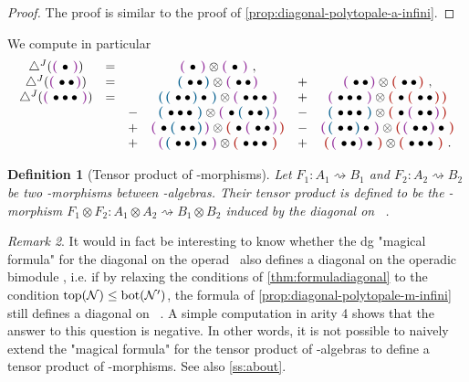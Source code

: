 \documentclass[twoside, 12pt]{amsart}
\newtheorem{definition}{Definition}[section]
\theoremstyle{remark}
\newtheorem{remark}[definition]{\sc Remark}
\begin{document}
\begin{proof}
The proof is similar to the proof of \cref{prop:diagonal-polytopale-a-infini}. 
\end{proof}

We compute in particular 
\[
\begin{matrix}
\diagminf ( \purple{ \bullet } )  
&=&  & \purple{ \bullet } \otimes \purple{ \bullet } \ , & &  \\
\diagminf ( \purple{ \bullet \bullet } ) 
&=& & \blue{\bullet \bullet} \otimes \purple{\bullet \bullet} & + & \purple{\bullet \bullet} \otimes \red{\bullet \bullet} \ , \\
\diagminf (\purple{\bullet \bullet \bullet}) 
&=& 
& \blue{\blue{\bullet \bullet}\bullet} \otimes \purple{\bullet \bullet \bullet} 
& + & \purple{\bullet \bullet \bullet} \otimes \red{\bullet \red{\bullet \bullet}} \\
& &- &  \blue{\bullet \bullet \bullet} \otimes \purple{\bullet \blue{\bullet \bullet}}    &  - & \blue{\bullet \bullet \bullet} \otimes \red{\bullet \purple{\bullet \bullet}}  \\  &   &+ & \purple{\bullet \blue{\bullet \bullet}} \otimes \red{\bullet \purple{\bullet \bullet}} 
  &  - & \purple{\blue{\bullet \bullet} \bullet} \otimes \red{\purple{\bullet \bullet} \bullet} \\ & &  + & \purple{\blue{\bullet \bullet} \bullet} \otimes \red{\bullet \bullet \bullet}   &  + & \red{\purple{\bullet \bullet} \bullet} \otimes \red{\bullet \bullet \bullet} \ .
  \end{matrix}
\]

\begin{definition}[Tensor product of \Ainf -morphisms] \label{def:tensor-ainf-morph}
Let $F_1 : A_1 \rightsquigarrow B_1$ and $F_2 : A_2 \rightsquigarrow B_2$ be two \Ainf -morphisms between \Ainf-algebras.
Their tensor product is defined to be the \Ainf -morphism $F_1 \otimes F_2 : A_1 \otimes A_2 \rightsquigarrow B_1 \otimes B_2$ induced by the diagonal \diagminf on \Minf \ .
\end{definition}

\begin{remark} \label{rmk:non-a-topbot}
It would in fact be interesting to know whether the dg "magical formula" for the diagonal on the operad \Ainf\
also defines a diagonal on the operadic bimodule \Minf, i.e. if by relaxing the conditions of \cref{thm:formuladiagonal} to the condition $\operatorname{top}(\mathcal{N}) \leq \operatorname{bot}(\mathcal{N'})$, the formula of \cref{prop:diagonal-polytopale-m-infini} still defines a diagonal on \Minf \ . A simple computation in arity 4 shows that the answer to this question is negative. In other words, it is not possible to naively extend the "magical formula" for the tensor product of \Ainf -algebras to define a tensor product of \Ainf -morphisms. See also \cref{ss:about}.
\end{remark}
\end{document}
